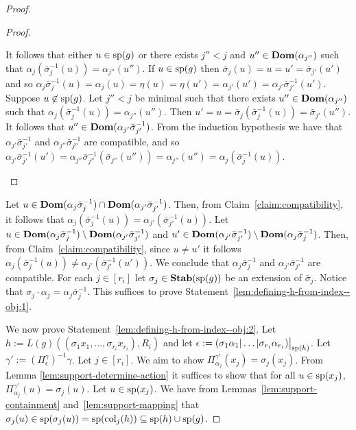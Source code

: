 \documentclass[../main/thesis.tex]{subfiles}
\begin{document}
\begin{proof}
\begin{proof}
\begin{myenum}
      It follows that either $u \in \text{sp}(g)$ or there exists $j'' < j$ and
      $u'' \in \text{\textbf{Dom}}(\alpha_{j''})$ such that $\alpha_j(\bar{\sigma}^{-1}_j(u)) =
      \alpha_{j''}(u'')$. If $u \in \text{sp}(g)$ then $\bar{\sigma}_{j}(u) = u =
      u' = \bar{\sigma}_{j'}(u')$ and so $\alpha_j \bar{\sigma}^{-1}_j(u) =
      \alpha_j (u) = \eta (u) = \eta (u') = \alpha_{j'}(u') =
      \alpha_{j'}\bar{\sigma}^{-1}_{j'}(u')$. Suppose $u \not\in \text{sp}(g)$. Let
      $j'' < j$ be minimal such that there exists $u'' \in \text{\textbf{Dom}}(\alpha_{j''})$
      such that $\alpha_{j} (\bar{\sigma}^{-1}_{j}(u)) = \alpha_{j''} (u'')$.
      Then $u' = u = \bar{\sigma}_j (\bar{\sigma}^{-1}_{j}(u)) =
      \bar{\sigma}_{j'}(u'')$. It follows that $u'' \in
      \text{\textbf{Dom}}(\alpha_{j'}\bar{\sigma}^{-1}_{j'})$. From the induction hypothesis we
      have that $\alpha_{j'}\bar{\sigma}^{-1}_{j'}$ and
      $\alpha_{j''}\bar{\sigma}^{-1}_{j''}$ are compatible, and so
      $\alpha_{j'}\bar{\sigma}^{-1}_{j'}(u') =
      \alpha_{j''}\bar{\sigma}^{-1}_{j''}(\bar{\sigma}_{j''}(u'')) =
      \alpha_{j''}(u'') = \alpha_{j} (\bar{\sigma}^{-1}_{j}(u))$.
    \end{myenum}
  \end{proof}

  Let $u \in \text{\textbf{Dom}}(\alpha_{j}\bar{\sigma}^{-1}_j) \cap
  \text{\textbf{Dom}}(\alpha_{j'}\bar{\sigma}^{-1}_{j'})$. Then, from
  Claim~\ref{claim:compatibility}, it follows that $\alpha_j
  (\bar{\sigma}^{-1}_j(u)) = \alpha_{j'}(\bar{\sigma}^{-1}_{j'}(u))$. Let $u \in
  \text{\textbf{Dom}}(\alpha_{j}\bar{\sigma}^{-1}_j) \setminus
  \text{\textbf{Dom}}(\alpha_{j'}\bar{\sigma}^{-1}_{j'})$ and $u' \in
  \text{\textbf{Dom}}(\alpha_{j'}\bar{\sigma}^{-1}_{j'}) \setminus
  \text{\textbf{Dom}}(\alpha_{j}\bar{\sigma}^{-1}_j)$. Then, from
  Claim~\ref{claim:compatibility}, since $u \neq u'$ it follows $\alpha_j
  (\bar{\sigma}^{-1}_j(u)) \neq \alpha_{j'}(\bar{\sigma}^{-1}_{j'}(u'))$. We
  conclude that $\alpha_{j}\bar{\sigma}^{-1}_{j}$ and
  $\alpha_{j'}\bar{\sigma}^{-1}_{j'}$ are compatible. For each $j \in [r_i]$ let
  $\sigma_j \in \text{\textbf{Stab}} (\text{sp} (g))$ be an extension of $\bar{\sigma}_j$. Notice that
  $\sigma_j \cdot \alpha_j = \alpha_j \bar{\sigma}^{-1}_j$. This suffices to
  prove Statement~\ref{lem:defining-h-from-index--obj:1}.

  We now prove Statement~\ref{lem:defining-h-from-index--obj:2}. Let $h :=
  L(g)((\sigma_1 x_1, \ldots, \sigma_{r_i} x_{r_i}), R_i)$ and let $\epsilon :=
  \restr{(\sigma_1 \alpha_1 \vert \ldots \vert \sigma_{r_i}
    \alpha_{r_i})}{\consp(h)}$. Let $\gamma' :=
  (\Pi^{\gamma}_\epsilon)^{-1}\gamma$. Let $j \in [r_i]$. We aim to show
  $\Pi^{\gamma'}_{\alpha_j}(x_j) = \sigma_j (x_j)$. From Lemma
  \ref{lem:support-determine-action} it suffices to show that for all $u \in
  \text{sp}(x_j)$, $\Pi^{\gamma'}_{\alpha_j} (u) = \sigma_j (u)$. Let $u \in
  \text{sp}(x_j)$. We have from Lemmas~\ref{lem:support-containment}
  and~\ref{lem:support-mapping} that $\sigma_j (u) \in \text{sp}(\sigma_j (u)) =
  \text{sp}(\text{\upshape col}_{j}(h)) \subseteq \text{sp}(h) \cup \text{sp}(g)$.


\end{proof}
\end{document}

